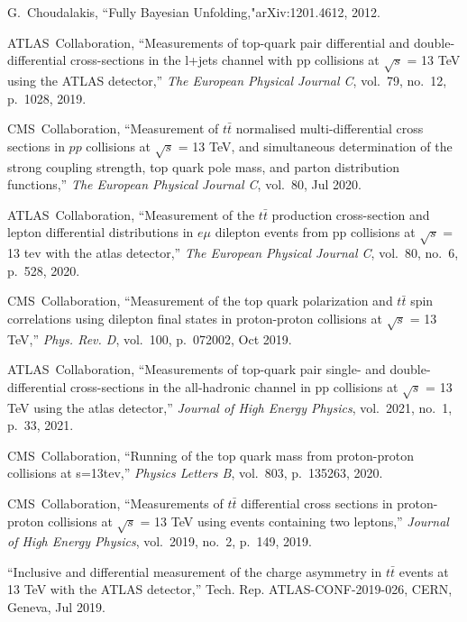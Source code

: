 \documentclass[12pt]{article}
\begin{document}
\begin{thebibliography}{99}
G.~Choudalakis, ``Fully Bayesian Unfolding,"arXiv:1201.4612, 2012.

ATLAS~Collaboration, ``Measurements of top-quark pair differential and
  double-differential cross-sections in the l+jets channel with pp collisions at
  $\sqrt{s}$ = 13 TeV using the ATLAS
  detector,'' {\em The European Physical Journal C}, vol.~79, no.~12, p.~1028,
  2019.

CMS~Collaboration, ``Measurement of $t\bar{t}$ normalised
  multi-differential cross sections in $pp$ collisions
  at $\sqrt{s}$ = 13 TeV, and simultaneous determination of the
  strong coupling strength, top quark pole mass, and parton distribution
  functions,'' {\em The European Physical Journal C}, vol.~80, Jul 2020.

ATLAS~Collaboration, ``Measurement of the $t\bar{t}$ production cross-section and
  lepton differential distributions in $e\mu$ dilepton events from pp
  collisions at $\sqrt{s}$ = 13 tev with the atlas detector,'' {\em The
  European Physical Journal C}, vol.~80, no.~6, p.~528, 2020.

CMS~Collaboration, ``Measurement of the top quark polarization and $t\bar{t}$
  spin correlations using dilepton final states in proton-proton collisions at
  $\sqrt{s}$ = 13 TeV,'' {\em Phys. Rev. D}, vol.~100, p.~072002, Oct 2019.
 
ATLAS~Collaboration, ``Measurements of top-quark pair single- and
  double-differential cross-sections in the all-hadronic channel in pp
  collisions at $\sqrt{s}$ = 13 TeV using the atlas detector,'' {\em Journal of
  High Energy Physics}, vol.~2021, no.~1, p.~33, 2021.

CMS~Collaboration, ``Running of the top quark mass from proton-proton
  collisions at s=13tev,'' {\em Physics Letters B}, vol.~803, p.~135263, 2020.

CMS~Collaboration, ``Measurements of $t\bar{t}$ differential cross sections in proton-proton collisions at
  $\sqrt{s}$ = 13 TeV using events containing two leptons,'' {\em Journal of High
  Energy Physics}, vol.~2019, no.~2, p.~149, 2019.

``{Inclusive and differential measurement of the charge asymmetry in $t\bar{t}$
  events at 13 TeV with the ATLAS detector},'' Tech. Rep. ATLAS-CONF-2019-026,
  CERN, Geneva, Jul 2019.

\end{thebibliography}
\end{document}
